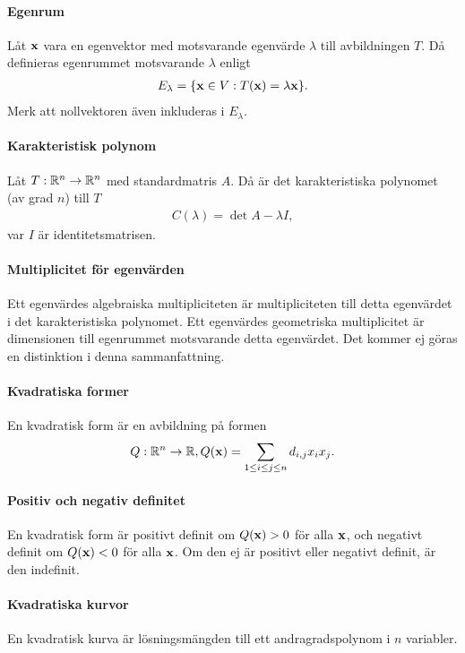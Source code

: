 \paragraph{Egenrum}
Låt $\vect{x}$ vara en egenvektor med motsvarande egenvärde $\lambda$ till avbildningen $T$. Då definieras egenrummet motsvarande $\lambda$ enligt
\begin{align*}
	E_\lambda = \{\vect{x}\in V: T(\vect{x}) = \lambda\vect{x}\}.
\end{align*}
Merk att nollvektoren även inkluderas i $E_\lambda$.

\paragraph{Karakteristisk polynom}
Låt $T: \mathbb{R}^n\to\mathbb{R}^n$ med standardmatris $A$. Då är det karakteristiska polynomet (av grad $n$) till $T$
\begin{align*}
	C(\lambda) = \det{A - \lambda I},
\end{align*}
var $I$ är identitetsmatrisen.

\paragraph{Multiplicitet för egenvärden}
Ett egenvärdes algebraiska multipliciteten är multipliciteten till detta egenvärdet i det karakteristiska polynomet. Ett egenvärdes geometriska multiplicitet är dimensionen till egenrummet motsvarande detta egenvärdet. Det kommer ej göras en distinktion i denna sammanfattning.

\paragraph{Kvadratiska former}
En kvadratisk form är en avbildning på formen
\begin{align*}
	Q: \R^n\to\R, Q(\vect{x}) = \sum\limits_{1\leq i\leq j\leq n}d_{i, j}x_ix_j.
\end{align*}

\paragraph{Positiv och negativ definitet}
En kvadratisk form är positivt definit om $Q(\vect{x}) > 0$ för alla $\vect{x}$, och negativt definit om $Q(\vect{x}) < 0$ för alla $\vect{x}$. Om den ej är positivt eller negativt definit, är den indefinit.

\paragraph{Kvadratiska kurvor}
En kvadratisk kurva är lösningsmängden till ett andragradspolynom i $n$ variabler.

